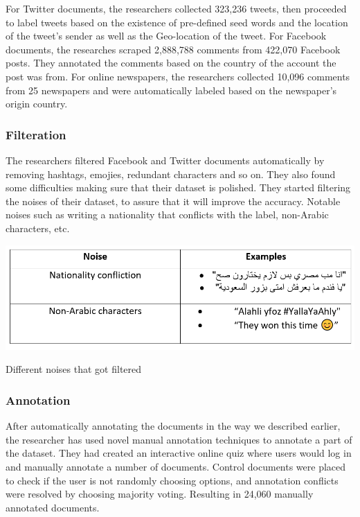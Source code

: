 \documentclass[12pt]{diazessay}
\begin{document}
                For Twitter documents, the researchers collected 323,236 tweets, then proceeded to label tweets based on the existence of pre-defined seed words and the location of the tweet's sender as well as the Geo-location of the tweet. For Facebook documents, the researches scraped 2,888,788 comments from 422,070 Facebook posts. They annotated the comments based on the country of the account the post was from. For online newspapers, the researchers collected 10,096 comments from 25 newspapers and were automatically labeled based on the newspaper's origin country\cite{alshutayri}.
                
                \subsubsection{Filteration}
                The researchers filtered Facebook and Twitter documents automatically by removing hashtags, emojies, redundant characters and so on. They also found some difficulties making sure that their dataset is polished. They started filtering the noises of their dataset, to assure that it will improve the accuracy. Notable noises such as writing a nationality that conflicts with the label, non-Arabic characters, etc.\cite{alshutayri}
        
                \begin{table}[h]
                    \centering
                    \includegraphics[scale=0.80]{Figures/noises_table_edited.PNG}
                    \caption{Different noises that got filtered}
                    \label{tbl:noises}
                \end{table}
                
                \subsubsection{Annotation} 
                \label{txt:annotation}    
                After automatically annotating the documents in the way we described earlier, the researcher has used novel manual annotation techniques to annotate a part of the dataset. They had created an interactive online quiz where users would log in and manually annotate a number of documents. Control documents were placed to check if the user is not randomly choosing options, and annotation conflicts were resolved by choosing majority voting. Resulting in 24,060 manually annotated documents. \cite{alshutayri}
                
\end{document}
